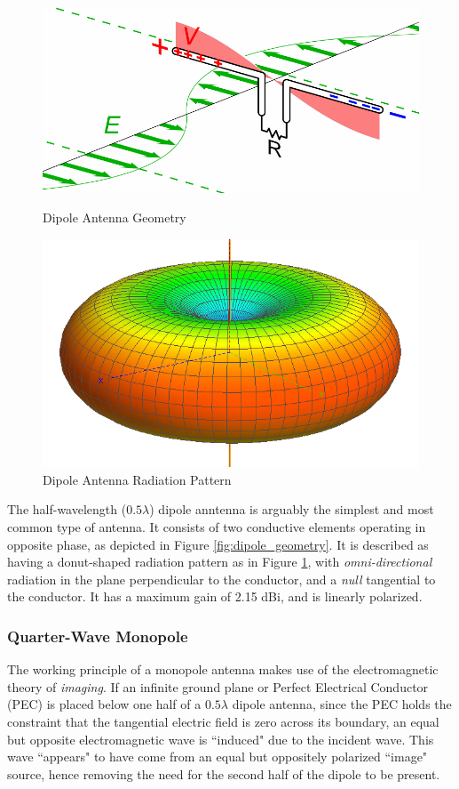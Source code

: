 \begin{figure}[!htb]
  \begin{minipage}{.55\textwidth}
    \centering
    \includegraphics[width=0.8\linewidth]{dipole_geometry}
    \caption{Dipole Antenna Geometry \cite{site-dipoleAntenna}}
    \label{fig:dipole_geometry}
  \end{minipage}
  \begin{minipage}{.44\textwidth}
    \centering
    \includegraphics[width=0.6\linewidth]{dipole_pattern}
    \caption{Dipole Antenna Radiation Pattern}
    \label{fig:dipole_pattern}
  \end{minipage}
\end{figure}

The half-wavelength ($0.5 \lambda$) dipole anntenna is arguably the simplest and most common type of antenna. It consists of two conductive elements operating in opposite phase, as depicted in Figure \ref{fig:dipole_geometry}. It is described as having a donut-shaped radiation pattern as in Figure \ref{fig:dipole_pattern}, with \textit{omni-directional} radiation in the plane perpendicular to the conductor, and a \textit{null} tangential to the conductor. It has a maximum gain of 2.15 dBi, and is linearly polarized. \cite{site-antennaTheory}

\subsubsection{Quarter-Wave Monopole}\label{monopole}
The working principle of a monopole antenna makes use of the electromagnetic theory of \textit{imaging}. If an infinite ground plane or Perfect Electrical Conductor (PEC) is placed below one half of a $0.5 \lambda$ dipole antenna, since the PEC holds the constraint that the tangential electric field is zero across its boundary, an equal but opposite electromagnetic wave is ``induced" due to the incident wave. This wave ``appears" to have come from an equal but oppositely polarized ``image" source, hence removing the need for the second half of the dipole to be present.


